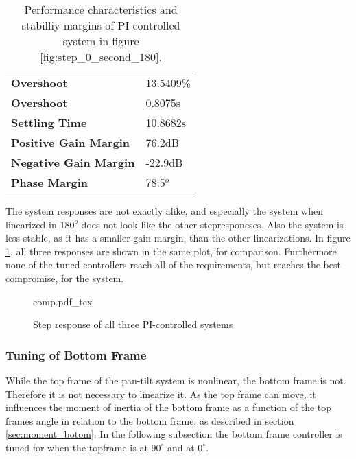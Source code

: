\documentclass[../../../Main]{subfiles}
\begin{document}
\begin{table}[h]
	 \centering
	 \begin{tabular}{ll}
		 \textbf{Overshoot} & 13.5409\%\\
		 \textbf{Overshoot} & 0.8075s\\
		 \textbf{Settling Time} & 10.8682s\\
		 \textbf{Positive Gain Margin} & 76.2dB\\
		 \textbf{Negative Gain Margin} & -22.9dB\\
		 \textbf{Phase Margin} & 78.5$^o$
	 \end{tabular}
	 \caption{Performance characteristics and stabilliy margins of PI-controlled system in figure \ref{fig:step_0_second_180}.}
	 \label{tab:performance_0_4}
\end{table}

The system responses are not exactly alike, and especially the system when linearized in $180^o$ does not look like the other stepresponeses. Also the system is less stable, as it has a smaller gain margin, than the other linearizations. In figure \ref{fig:comp}, all three responses are shown in the same plot, for comparison. Furthermore none of the tuned controllers reach all of the requirements, but reaches the best compromise, for the system.

\begin{figure}[H]
\centering
\def\svgwidth{\textwidth}
{comp.pdf_tex}
\caption{Step response of all three PI-controlled systems}
\label{fig:comp}
\end{figure}

\subsubsection{Tuning of Bottom Frame}

While the top frame of the pan-tilt system is nonlinear, the bottom frame is not. Therefore it is not necessary to linearize it. As the top frame can move, it influences the moment of inertia of the bottom frame as a function of the top frames angle in relation to the bottom frame, as described in section \ref{sec:moment_botom}.
In the following subsection the bottom frame controller is tuned for when the topframe is at $90^\circ$ and at $0^\circ$.
\end{document}
